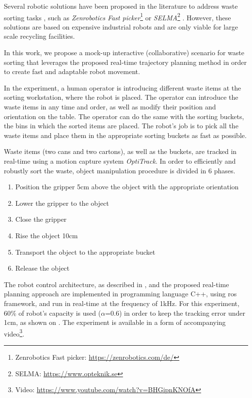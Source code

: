Several robotic solutions have been proposed in the literature to address waste sorting tasks \cite{SARC2019}, such as \textit{Zenrobotics Fast picker}\footnote{Zenrobotics Fast picker: \url{https://zenrobotics.com/de/}} or \textit{SELMA}\footnote{SELMA: \url{https://www.opteknik.se}} . However, these solutions are based on expensive industrial robots and are only viable for large scale recycling facilities.

In this work, we propose a mock-up interactive (collaborative) scenario for waste sorting that leverages the proposed real-time trajectory planning method in order to create fast and adaptable robot movement. 

In the experiment, a human operator is introducing different waste items at the sorting workstation, where the robot is placed. The operator can introduce the waste items in any time and order, as well as modify their position and orientation on the table. The operator can do the same with the sorting buckets, the bins in which the sorted items are placed. The robot's job is to pick all the waste items and place them in the appropriate sorting buckets as fast as possible.

Waste items (two cans and two cartons), as well as the buckets, are tracked in real-time using a motion capture system \textit{OptiTrack}. In order to efficiently and robustly sort the waste, object manipulation procedure is divided in 6 phases.

\begin{enumerate}
    \item Position the gripper 5cm above the object with the appropriate orientation
    \item Lower the gripper to the object
    \item Close the gripper
    \item Rise the object 10cm
    \item Transport the object to the appropriate bucket
    \item Release the object
\end{enumerate}

The robot control architecture, as described in , and the proposed real-time planning approach are implemented in 
programming language C++, using \gls{ros} framework, and run in real-time at the frequency of 1kHz. For this experiment, 60\% of robot's capacity is used ($\alpha$=0.6) in order to keep the tracking error under 1cm, as shown on .
The experiment is available in a form of accompanying video\footnote{Video: \url{https://www.youtube.com/watch?v=BHGipnKNOfA}}.

